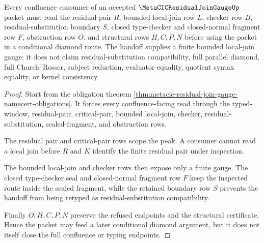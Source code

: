 \begin{theorem}
\label{thm:metacic-residual-join-gauge-diamond-handoff}
Every confluence consumer of an accepted $\MetaCICResidualJoinGaugeUp$ packet must read the residual pair $R$, bounded local-join row $L$, checker row $B$, residual-substitution boundary $S$, closed type-checker and closed-normal fragment row $F$, obstruction row $O$, and structural rows $H,C,P,N$ before using the packet in a conditional diamond route. The handoff supplies a finite bounded local-join gauge; it does not claim residual-substitution compatibility, full parallel diamond, full Church--Rosser, subject reduction, evaluator equality, quotient syntax equality, or kernel consistency.
\end{theorem}
\begin{proof}
Start from the obligation theorem \autoref{thm:metacic-residual-join-gauge-namecert-obligations}. It forces every confluence-facing read through the typed-window, residual-pair, critical-pair, bounded local-join, checker, residual-substitution, sealed-fragment, and obstruction rows.

The residual pair and critical-pair rows scope the peak. A consumer cannot read a local join before $R$ and $K$ identify the finite residual pair under inspection.

The bounded local-join and checker rows then expose only a finite gauge. The closed type-checker seal and closed-normal fragment row $F$ keep the inspected route inside the sealed fragment, while the retained boundary row $S$ prevents the handoff from being retyped as residual-substitution compatibility.

Finally $O,H,C,P,N$ preserve the refused endpoints and the structural certificate. Hence the packet may feed a later conditional diamond argument, but it does not itself close the full confluence or typing endpoints.
\end{proof}



